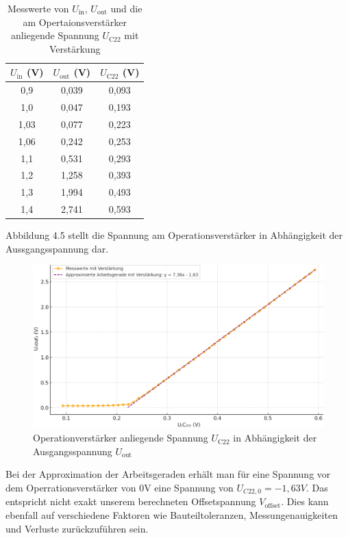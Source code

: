\begin{table}[h]
\centering
\begin{tabular}{|c|c|c|}
\hline
$U_{\text{in}}$ (V) & $U_{\text{out}}$ (V) & $U_\text{C22}$ (V) \\
\hline
0{,}9 & 0{,}039 & 0{,}093 \\
1{,}0 & 0{,}047 & 0{,}193 \\
1{,}03 & 0{,}077 & 0{,}223 \\
1{,}06 & 0{,}242 & 0{,}253 \\
1{,}1 & 0{,}531 & 0{,}293 \\
1{,}2 & 1{,}258 & 0{,}393 \\
1{,}3 & 1{,}994 & 0{,}493 \\
1{,}4 & 2{,}741 & 0{,}593 \\
\hline
\end{tabular}
\caption{Messwerte von $U_{\text{in}}$, $U_{\text{out}}$ und die am Opertaionsverstärker anliegende Spannung $U_\text{C22}$ mit Verstärkung}
\end{table}
\clearpage
Abbildung 4.5 stellt die Spannung am Operationsverstärker in Abhängigkeit der Aussgangsspannung dar.
\begin{figure}[H]
    \centering
    \includegraphics[width=1\textwidth]{Pictures/uc22.png}
    \caption{Operationverstärker anliegende Spannung $U_{\text{C22}}$ in Abhängigkeit der Ausgangsspannung $U_{\text{out}}$ }
    \label{fig:uc22}
\end{figure}
Bei der Approximation der Arbeitsgeraden erhält man für eine Spannung vor dem Operrationsverstärker von 0V eine 
Spannung von $U_{C22,0}=-1,63V$. Das entspricht nicht exakt unserem berechneten Offsetspannung \( V_\text{offset} \). 
Dies kann ebenfall auf verschiedene Faktoren wie Bauteiltoleranzen, Messungenauigkeiten und Verluste zurückzuführen sein.


